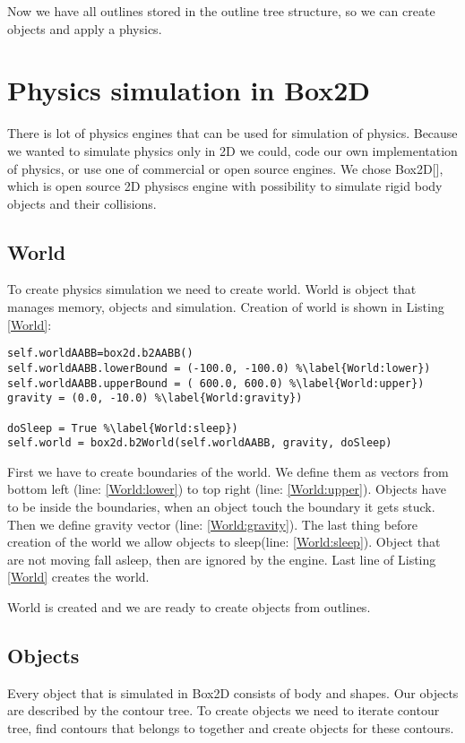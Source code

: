 \documentclass{ifacconf}
\begin{document}
Now we have all outlines stored in the outline tree structure, so we can create
objects and apply a physics.

\section{Physics simulation in Box2D}
There is lot of physics engines that can be used for simulation of physics.
Because we wanted to simulate physics only in 2D we could, code our own
implementation of physics, or use one of commercial or open source engines. We
chose Box2D[\cite{GameEngines}], which is open source 2D physiscs engine with
possibility to simulate rigid body objects and their collisions.
\subsection{World}
To create physics simulation we need to create world. World is object that
manages memory, objects and simulation. Creation of world is shown in Listing
\ref{World}:
\begin{lstlisting}[caption=Creation of Box2D world,label=World]
self.worldAABB=box2d.b2AABB()
self.worldAABB.lowerBound = (-100.0, -100.0) %\label{World:lower})
self.worldAABB.upperBound = ( 600.0, 600.0)	%\label{World:upper})
gravity = (0.0, -10.0) %\label{World:gravity})

doSleep = True %\label{World:sleep})
self.world = box2d.b2World(self.worldAABB, gravity, doSleep)
\end{lstlisting}
First we have to create boundaries of the world. We define them as vectors from
bottom left (line: \ref{World:lower}) to top right (line:
\ref{World:upper}). Objects have to be inside the boundaries, when an object
touch the boundary it gets stuck. Then we define gravity vector (line:
\ref{World:gravity}). The last thing before creation of the world we allow
objects to sleep(line: \ref{World:sleep}). Object that are not moving fall
asleep, then are ignored by the engine. Last line of Listing \ref{World} creates
the world.

World is created and we are ready to create objects from outlines.
\subsection{Objects}
Every object that is simulated in Box2D consists of body and shapes. Our objects
are described by the contour tree. To create objects we need to iterate contour
tree, find contours that belongs to together and create objects for these
contours.
\end{document}
